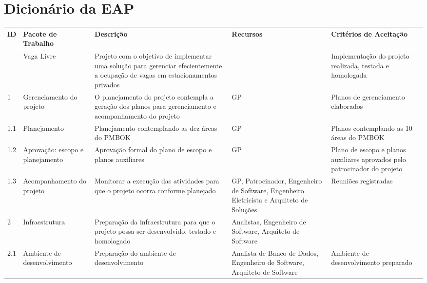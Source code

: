 
\chapter{Dicionário da EAP}
\label{ch:wbs-dictionary}

	\begin{longtable}{ l  p{}  p{}  p{}  p{}  }
		\toprule
		\textbf{ID} & \textbf{Pacote de Trabalho}                               & \textbf{Descrição} & \textbf{Recursos} & \textbf{Critérios de Aceitação} \\
		\midrule
		            & Vaga Livre                                                & Projeto com o objetivo de implementar uma solução para gerenciar efecientemente a ocupação de vagas em estacionamentos privados & & Implementação do projeto realizada, testada e homologada \\*
		\midrule
		1           & Gerenciamento do projeto                                  & O planejamento do projeto contempla a geração dos planos para gerenciamento e acompanhamento do projeto  & GP & Planos de gerenciamento elaborados \\*
		\midrule
		1.1         & Planejamento                                              & Planejamento contemplando as dez áreas do PMBOK & GP & Planos contemplando as 10 áreas do PMBOK \\*
		\midrule
		1.2         & Aprovação: escopo e planejamento                        & Aprovação formal do plano de escopo e planos auxiliares & GP & Plano de escopo e planos auxiliares aprovados pelo patrocinador do projeto \\*
		\midrule
		1.3         & Acompanhamento do projeto                                 & Monitorar a execução das atividades para que o projeto ocorra conforme planejado & GP, Patrocinador, Engenheiro de Software, Engenheiro Eletricista e Arquiteto de Soluções & Reuniões registradas \\*
		\midrule
		2           & Infraestrutura                                            & Preparação da infraestrutura para que o projeto possa ser desenvolvido, testado e homologado & Analistas, Engenheiro de Software, Arquiteto de Software & \\*
		\midrule
		2.1         & Ambiente de desenvolvimento                               & Preparação do ambiente de desenvolvimento & Analista de Banco de Dados, Engenheiro de Software, Arquiteto de Software & Ambiente de desenvolvimento preparado \\*

\end{longtable}
